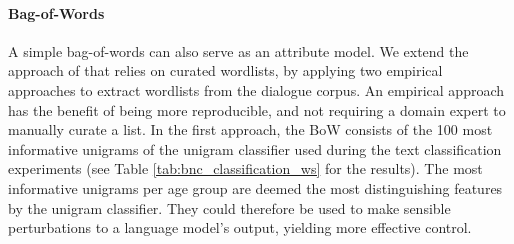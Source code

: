 \paragraph{Bag-of-Words} A simple bag-of-words can also serve as an attribute model. 
We extend the approach of \cite{dathathri2019plug} that relies on curated wordlists, by applying two empirical approaches to extract wordlists from the dialogue corpus. An empirical approach has the benefit of being more reproducible, and not requiring a domain expert to manually curate a list. In the first approach, the BoW consists of the 100 most informative unigrams of the unigram classifier used during the text classification experiments (see Table \ref{tab:bnc_classification_ws} for the results). The most informative unigrams per age group are deemed the most distinguishing features by the unigram classifier. They could therefore be used to make sensible perturbations to a language model's output, yielding more effective control.

